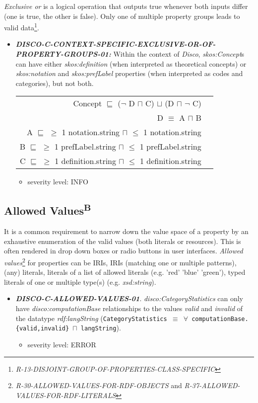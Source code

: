 \documentclass{llncs}
\newcommand{\ms}[1]{\texttt{#1}}
\newenvironment{DL}{
  \vspace{0cm}
  \begin{tabular}{r l}

}{
  \end{tabular}
}
\begin{document}
\emph{Exclusive or} is a logical operation that outputs true whenever both inputs differ (one is true, the other is false).
Only one of multiple property groups leads to valid data\footnote{{\em R-13-DISJOINT-GROUP-OF-PROPERTIES-CLASS-SPECIFIC}}.

\begin{itemize}
	\item \textbf{{\em DISCO-C-CONTEXT-SPECIFIC-EXCLUSIVE-OR-OF-PROPERTY-GROUPS-01:}}
Within the context of \emph{Disco}, \emph{skos:Concept}s can have either \emph{skos:definition} (when interpreted as theoretical concepts) or \emph{skos:notation} and \emph{skos:prefLabel} properties (when interpreted as codes and categories), but not both.
\begin{DL}
Concept $\sqsubseteq$ ($\neg$ D $\sqcap$ C) $\sqcup$ (D $\sqcap$ $\neg$ C) \\ 
D $\equiv$ A $\sqcap$ B \\
A $\sqsubseteq$ $\geq$ 1 notation.string $\sqcap$ $\leq$ 1 notation.string \\
B $\sqsubseteq$ $\geq$ 1 prefLabel.string $\sqcap$ $\leq$ 1 prefLabel.string \\
C $\sqsubseteq$ $\geq$ 1 definition.string $\sqcap$ $\leq$ 1 definition.string \\
\end{DL}
\begin{itemize}
		\item severity level: INFO
	\end{itemize}
\end{itemize}

\subsection{Allowed Values\textsuperscript{B}}

It is a common requirement to narrow down the value space of a property by an exhaustive enumeration of the valid values (both literals or resources). 
This is often rendered in drop down boxes or radio buttons in user interfaces. 
\emph{Allowed values}\footnote{{\em R-30-ALLOWED-VALUES-FOR-RDF-OBJECTS} and 
{\em R-37-ALLOWED-VALUES-FOR-RDF-LITERALS}} for properties can be IRIs, IRIs (matching one or multiple patterns), (any) literals, literals of a list of allowed literals (e.g. 'red' 'blue' 'green'), typed literals of one or multiple type(s) (e.g. \emph{xsd:string}).

\begin{itemize}
	\item \textbf{{\em DISCO-C-ALLOWED-VALUES-01}}.
{\em disco:CategoryStatistics} can only have {\em disco:computationBase} relationships to the values \emph{valid} and \emph{invalid} of the datatype {\em rdf:langString} (\ms{CategoryStatistics $\equiv$ $\forall$ computationBase.\{valid,invalid\} $\sqcap$ langString}).
	\begin{itemize}
		\item severity level: ERROR
	\end{itemize}
\end{itemize}
\end{document}
